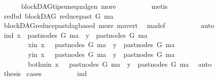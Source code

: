 \begin{isabellebody}
\ \ \ \ \ \ blockDAG{\isachardot}{\kern0pt}tips{\isacharunderscore}{\kern0pt}unequal{\isacharunderscore}{\kern0pt}gen\ more\isanewline
\ \ \ \ \ \ \ \ \isamarkupfalse%
\ metis\isanewline
\ \ \ \ \ \ \isamarkupfalse%
\ \isamarkupfalse%
\ red{\isacharunderscore}{\kern0pt}bd{\isacharcolon}{\kern0pt}\ {\isachardoublequoteopen}blockDAG\ {\isacharparenleft}{\kern0pt}reduce{\isacharunderscore}{\kern0pt}past\ G\ ma{\isacharparenright}{\kern0pt}{\isachardoublequoteclose}\ \ \isanewline
\ \ \ \ \ \ \ \ \isamarkupfalse%
\ blockDAG{\isachardot}{\kern0pt}reduce{\isacharunderscore}{\kern0pt}past{\isacharunderscore}{\kern0pt}dagbased\ more\ ma{\isacharunderscore}{\kern0pt}vert\ \isamarkupfalse%
\ ma{\isacharunderscore}{\kern0pt}def\isanewline
\ \ \ \ \ \ \ \ \isamarkupfalse%
\ auto\isanewline
\ \ \ \ \ \ \isamarkupfalse%
\ {\isacharparenleft}{\kern0pt}ind{\isacharparenright}{\kern0pt}\ {\isachardoublequoteopen}x\ {\isasymin}\ past{\isacharunderscore}{\kern0pt}nodes\ G\ ma\ {\isasymand}\ y\ {\isasymin}\ past{\isacharunderscore}{\kern0pt}nodes\ G\ ma{\isachardoublequoteclose}\isanewline
\ \ \ \ \ \ \ \ {\isacharbar}{\kern0pt}{\isacharparenleft}{\kern0pt}x{\isacharunderscore}{\kern0pt}in{\isacharparenright}{\kern0pt}\ {\isachardoublequoteopen}x\ {\isasymnotin}\ \ past{\isacharunderscore}{\kern0pt}nodes\ G\ ma\ {\isasymand}\ y\ {\isasymin}\ past{\isacharunderscore}{\kern0pt}nodes\ G\ ma{\isachardoublequoteclose}\isanewline
\ \ \ \ \ \ \ \ {\isacharbar}{\kern0pt}{\isacharparenleft}{\kern0pt}y{\isacharunderscore}{\kern0pt}in{\isacharparenright}{\kern0pt}\ {\isachardoublequoteopen}x\ {\isasymin}\ \ past{\isacharunderscore}{\kern0pt}nodes\ G\ ma\ {\isasymand}\ y\ {\isasymnotin}\ past{\isacharunderscore}{\kern0pt}nodes\ G\ ma{\isachardoublequoteclose}\isanewline
\ \ \ \ \ \ \ \ {\isacharbar}{\kern0pt}{\isacharparenleft}{\kern0pt}both{\isacharunderscore}{\kern0pt}nin{\isacharparenright}{\kern0pt}\ {\isachardoublequoteopen}x\ {\isasymnotin}\ \ past{\isacharunderscore}{\kern0pt}nodes\ G\ ma\ {\isasymand}\ y\ {\isasymnotin}\ past{\isacharunderscore}{\kern0pt}nodes\ G\ ma{\isachardoublequoteclose}\ \isamarkupfalse%
\ auto\isanewline
\ \ \ \ \ \ \isamarkupfalse%
\ \isamarkupfalse%
\ {\isacharquery}{\kern0pt}thesis\ \isamarkupfalse%
{\isacharparenleft}{\kern0pt}cases{\isacharparenright}{\kern0pt}\isanewline
\ \ \ \ \ \ \ \ \isamarkupfalse%
\ ind\isanewline
\ \ \ \ \ \ \ \ \isamarkupfalse%

\end{isabellebody}
